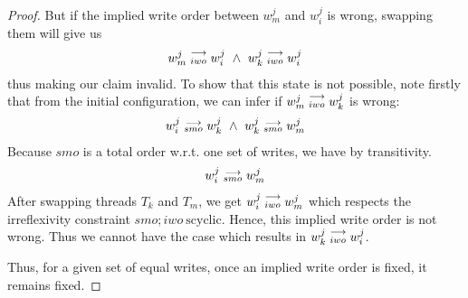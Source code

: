 \begin{proof}
            But if the implied write order between $w_m^j$ and $w_i^j$ is wrong, swapping them will give us 
            \begin{align}
                \reln{w_m^j}{iwo}{w_i^j} \ \wedge \ \reln{w_k^j}{iwo}{w_i^j}  
            \end{align}
            thus making our claim invalid. To show that this state is not possible, note firstly that from the initial configuration, we can infer if $w_m^j\stackrel{\longrightarrow}{_{iwo}}w_k^j$ is wrong:
            \begin{align}
                \reln{w_i^j}{smo}{w_k^j} \ \wedge \ \reln{w_k^j}{smo}{w_m^j}
            \end{align} 
            Because $smo$ is a total order w.r.t. one set of writes, we have by transitivity. 
            \begin{align}
                w_i^j\stackrel{\longrightarrow}{_{smo}}w_m^j
            \end{align}
            After swapping threads $T_k$ and $T_m$, we get $w_i^j\stackrel{\longrightarrow}{_{iwo}}w_m^j$ which respects the irreflexivity constraint $smo;iwo \ \text{scyclic}$. Hence, this implied write order is not wrong. Thus we cannot have the case which results in $w_k^j\stackrel{\longrightarrow}{_{iwo}}w_i^j$.  

            Thus, for a given set of equal writes, once an implied write order is fixed, it remains fixed.
        \end{proof}

